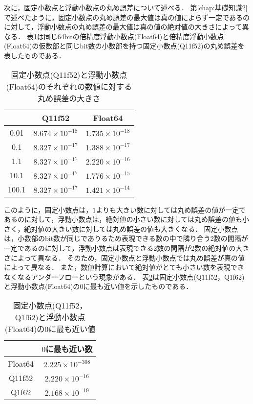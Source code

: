 次に，固定小数点と浮動小数点の丸め誤差について述べる．
第\ref{chap:基礎知識2}で述べたように，固定小数点の丸め誤差の最大値は真の値によらず一定であるのに対して，浮動小数点の丸め誤差の最大値は真の値の絶対値の大きさによって異なる．
表\ref{tab:fixed_float_rounding_error}は同じ64bitの倍精度浮動小数点(Float64)と倍精度浮動小数点(Float64)の仮数部と同じbit数の小数部を持つ固定小数点(Q11f52)の丸め誤差を表したものである．

\begin{table}[H]
    \centering
    \caption{固定小数点(Q11f52)と浮動小数点(Float64)のそれぞれの数値に対する丸め誤差の大きさ}
    \begin{tabular}{c|c|c}
        & Q11f52 & Float64 \\ \hline \hline
        0.01 & $8.674 \times 10^{-18}$ & $1.735 \times 10^{-18}$\\
        0.1 & $8.327 \times 10^{-17}$ & $1.388 \times 10^{-17}$\\
        1.1 & $8.327 \times 10^{-17}$ & $2.220 \times 10^{-16}$\\
        10.1 & $8.327 \times 10^{-17}$ & $1.776 \times 10^{-15}$\\
        100.1 & $8.327 \times 10^{-17}$ & $1.421 \times 10^{-14}$ 
    \end{tabular}
    \label{tab:fixed_float_rounding_error}
\end{table}

このように，固定小数点は，$1$よりも大きい数に対しては丸め誤差の値が一定であるのに対して，浮動小数点は，絶対値の小さい数に対しては丸め誤差の値も小さく，絶対値の大きい数に対しては丸め誤差の値も大きくなる．
固定小数点は，小数部のbit数が同じでありるため表現できる数の中で隣り合う2数の間隔が一定であるのに対して，浮動小数点は表現できる2数の間隔が2数の絶対値の大きさによって異なる．
そのため，固定小数点と浮動小数点では丸め誤差が真の値によって異なる．
また，数値計算において絶対値がとても小さい数を表現できなくなるアンダーフローという現象がある．
表\ref{tab:fixed_float_zero_error}は固定小数点(Q11f52，Q1f62)と浮動小数点(Float64)の$0$に最も近い値を示したものである．

\begin{table}[H]
    \centering
    \caption{固定小数点(Q11f52，Q1f62)と浮動小数点(Float64)の$0$に最も近い値}
    \begin{tabular}{c|c}
        & $0$に最も近い数 \\ \hline \hline
        Float64 & $2.225 \times 10^{-308}$\\
        Q11f52  & $2.220 \times 10^{-16}$\\
        Q1f62   & $2.168 \times 10^{-19} $
    \end{tabular}
    \label{tab:fixed_float_zero_error}
\end{table}

